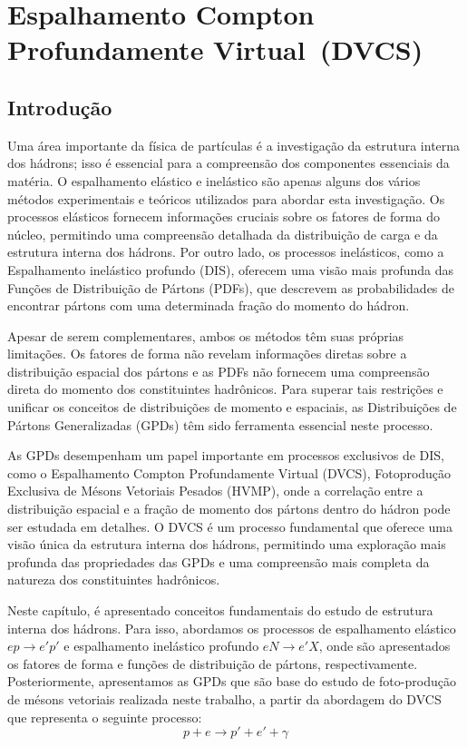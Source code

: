 \chapter{Espalhamento Compton Profundamente Virtual~(DVCS)}
\label{cap:cap1}
\section{Introdução}
Uma área importante da física de partículas é a investigação da estrutura interna dos hádrons; isso é essencial para a compreensão dos componentes essenciais da matéria. O espalhamento elástico e inelástico são apenas alguns dos vários métodos experimentais e teóricos utilizados para abordar esta investigação.
Os processos elásticos fornecem informações cruciais sobre os fatores de forma do núcleo, permitindo uma compreensão detalhada da distribuição de carga e da estrutura interna dos hádrons. Por outro lado, os processos inelásticos, como a Espalhamento inelástico profundo (DIS), oferecem uma visão mais profunda das Funções de Distribuição de Pártons (PDFs), que descrevem as probabilidades de encontrar pártons com uma determinada fração do momento do hádron.

Apesar de serem complementares, ambos os métodos têm suas próprias limitações. Os fatores de forma não revelam informações diretas sobre a distribuição espacial dos pártons e as PDFs não fornecem uma compreensão direta do momento dos constituintes hadrônicos. Para superar tais restrições e unificar os conceitos de distribuições de momento e espaciais, as Distribuições de Pártons Generalizadas (GPDs) têm sido ferramenta essencial neste processo.

As GPDs  desempenham um papel importante em processos exclusivos de DIS, como o Espalhamento Compton Profundamente Virtual (DVCS),  Fotoprodução Exclusiva de Mésons Vetoriais Pesados (HVMP),  onde a correlação entre a distribuição espacial e a fração de momento dos pártons dentro do hádron pode ser estudada em detalhes. O DVCS é um processo fundamental que oferece uma visão única da estrutura interna dos hádrons, permitindo uma exploração mais profunda das propriedades das GPDs e uma compreensão mais completa da natureza dos constituintes hadrônicos.

Neste capítulo, é apresentado conceitos fundamentais do estudo de estrutura interna dos hádrons. Para isso, abordamos os processos de espalhamento elástico $ep \rightarrow e' p'$ e espalhamento  inelástico profundo $eN \rightarrow e' X$, onde são apresentados os fatores de forma e funções de distribuição de pártons, respectivamente.   Posteriormente, apresentamos as GPDs que são base do estudo  de foto-produção de mésons vetoriais realizada neste trabalho,  a partir da abordagem do DVCS que representa o seguinte processo:
\begin{equation}
    p + e \rightarrow p' + e' + \gamma
\end{equation}

